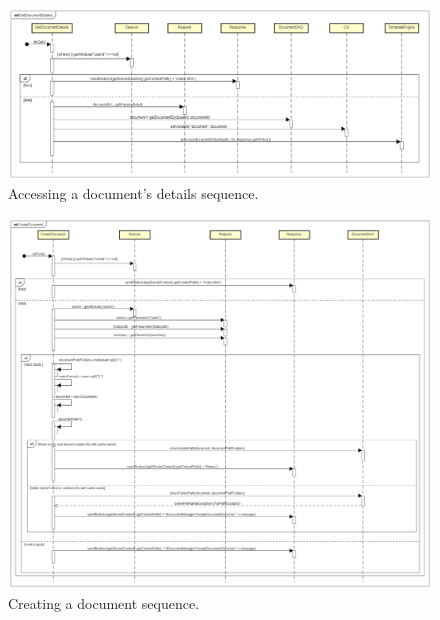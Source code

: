 \documentclass[a4paper,12pt]{article}
\begin{document}
\begin{figure}[H]
    \centering
    \includegraphics[width=1.0\textwidth]{HTML/SequenceDiagram/GetDocumentDetails.png}
    \caption{Accessing a document's details sequence.}
\end{figure}

\begin{figure}[H]
    \centering
    \includegraphics[width=1.0\textwidth]{HTML/SequenceDiagram/CreateDocument.png}
    \caption{Creating a document sequence.}
\end{figure}
    
\end{document}
